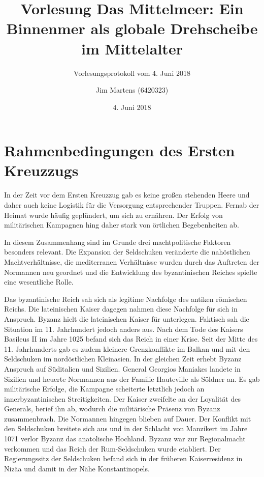 \documentclass[10pt,a4paper,oneside,ngerman,numbers=noenddot]{scrartcl}
\begin{document}
\author{Jim Martens (6420323)}
\title{Vorlesung Das Mittelmeer: Ein Binnenmer als globale Drehscheibe im Mittelalter}
\subtitle{Vorlesungsprotokoll vom 4. Juni 2018}
\date{4. Juni 2018}
\maketitle

\section{Rahmenbedingungen des Ersten Kreuzzugs}

In der Zeit vor dem Ersten Kreuzzug gab es keine großen stehenden Heere und daher
auch keine Logistik für die Versorgung entsprechender Truppen. Fernab der Heimat
wurde häufig geplündert, um sich zu ernähren. Der Erfolg von militärischen Kampagnen
hing daher stark von örtlichen Begebenheiten ab.

In diesem Zusammenhang sind im Grunde drei machtpolitische Faktoren besonders
relevant. Die Expansion der Seldschuken veränderte die nahöstlichen Machtverhältnisse,
die mediterranen Verhältnisse wurden durch das Auftreten der Normannen neu
geordnet und die Entwicklung des byzantinischen Reiches spielte eine wesentliche
Rolle.

Das byzantinische Reich sah sich als legitime Nachfolge des antiken römischen
Reichs. Die lateinischen Kaiser dagegen nahmen diese Nachfolge für sich in
Anspruch. Byzanz hielt die lateinischen Kaiser für unterlegen. Faktisch
sah die Situation im 11. Jahrhundert jedoch anders aus. Nach dem Tode des
Kaisers Basileus II im Jahre 1025 befand sich das Reich in einer Krise. Seit
der Mitte des 11. Jahrhunderts gab es zudem kleinere Grenzkonflikte im Balkan
und mit den Seldschuken im nordöstlichen Kleinasien.
In der gleichen Zeit erhebt Byzanz Anspruch auf Süditalien und Sizilien. General
Georgios Maniakes landete in Sizilien und heuerte Normannen aus der Familie
Hauteville als Söldner an. Es gab militärische Erfolge, die Kampagne scheiterte
letztlich jedoch an innerbyzantinischen Streitigkeiten. Der Kaiser zweifelte
an der Loyalität des Generals, berief ihn ab, wodurch die militärische Präsenz
von Byzanz zusammenbrach. Die Normannen hingegen blieben auf Dauer.
Der Konflikt mit den Seldschuken breitete sich aus und in der Schlacht von Manzikert
im Jahre 1071 verlor Byzanz das anatolische Hochland. Byzanz war zur Regionalmacht
verkommen und das Reich der Rum-Seldschuken wurde etabliert. Der Regierungssitz
der Seldschuken befand sich in der früheren Kaiserresidenz in Nizäa und damit
in der Nähe Konstantinopels.
\end{document}
